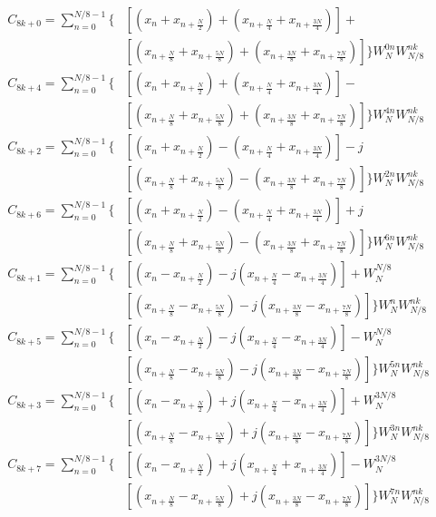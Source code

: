 \documentclass[journal,comsoc]{IEEEtran}
\begin{document}
\begin{align}\label{eqn:radix}
C_{8k+0} = \sum_{n=0}^{N/8-1} \bigg\{&[(x_n + x_{n+\frac{N}{2}}) + (x_{n+\frac{N}{4}} + x_{n+\frac{3N}{4}})] + 	   				    \\
&[(x_{n+\frac{N}{8}} + x_{n+\frac{5N}{8}}) + (x_{n+\frac{3N}{8}} + x_{n+\frac{7N}{8}})] \bigg\} W_N^{0n} W_{N/8}^ {nk}     \nonumber\\
%	
C_{8k+4} = \sum_{n=0}^{N/8-1} \bigg\{&[(x_n + x_{n+\frac{N}{2}}) + (x_{n+\frac{N}{4}} + x_{n+\frac{3N}{4}})] - 			   \nonumber\\
&[(x_{n+\frac{N}{8}} + x_{n+\frac{5N}{8}}) + (x_{n+\frac{3N}{8}} + x_{n+\frac{7N}{8}})] \bigg\} W_N^{4n} W_{N/8}^ {nk}     \nonumber\\
%
C_{8k+2} = \sum_{n=0}^{N/8-1} \bigg\{&[(x_n + x_{n+\frac{N}{2}}) - (x_{n+\frac{N}{4}} + x_{n+\frac{3N}{4}})] -j 		   \nonumber\\
&[(x_{n+\frac{N}{8}} + x_{n+\frac{5N}{8}}) - (x_{n+\frac{3N}{8}} + x_{n+\frac{7N}{8}})] \bigg\} W_N^{2n} W_{N/8}^ {nk}     \nonumber\\
%
C_{8k+6} = \sum_{n=0}^{N/8-1} \bigg\{&[(x_n + x_{n+\frac{N}{2}}) - (x_{n+\frac{N}{4}} + x_{n+\frac{3N}{4}})] +j			   \nonumber\\
&[(x_{n+\frac{N}{8}} + x_{n+\frac{5N}{8}}) - (x_{n+\frac{3N}{8}} + x_{n+\frac{7N}{8}})] \bigg\} W_N^{6n} W_{N/8}^ {nk}     \nonumber\\
%
C_{8k+1} = \sum_{n=0}^{N/8-1} \bigg\{&[(x_n - x_{n+\frac{N}{2}}) -j (x_{n+\frac{N}{4}} - x_{n+\frac{3N}{4}})] + W_N^{N/8}  \nonumber\\
&[(x_{n+\frac{N}{8}} - x_{n+\frac{5N}{8}}) -j (x_{n+\frac{3N}{8}} - x_{n+\frac{7N}{8}})] \bigg\} W_N^{n} W_{N/8}^ {nk}     \nonumber\\
%
C_{8k+5} = \sum_{n=0}^{N/8-1} \bigg\{&[(x_n - x_{n+\frac{N}{2}}) -j (x_{n+\frac{N}{4}} - x_{n+\frac{3N}{4}})] - W_N^{N/8}  \nonumber\\
&[(x_{n+\frac{N}{8}} - x_{n+\frac{5N}{8}}) -j (x_{n+\frac{3N}{8}} - x_{n+\frac{7N}{8}})] \bigg\} W_N^{5n} W_{N/8}^ {nk}    \nonumber\\
%
C_{8k+3} = \sum_{n=0}^{N/8-1} \bigg\{&[(x_n - x_{n+\frac{N}{2}}) +j (x_{n+\frac{N}{4}} - x_{n+\frac{3N}{4}})] + W_N^{3N/8} \nonumber\\
&[(x_{n+\frac{N}{8}} - x_{n+\frac{5N}{8}}) +j (x_{n+\frac{3N}{8}} - x_{n+\frac{7N}{8}})] \bigg\} W_N^{3n} W_{N/8}^ {nk}    \nonumber\\
%
C_{8k+7} = \sum_{n=0}^{N/8-1} \bigg\{&[(x_n - x_{n+\frac{N}{2}}) +j (x_{n+\frac{N}{4}} + x_{n+\frac{3N}{4}})] - W_N^{3N/8} \nonumber\\
&[(x_{n+\frac{N}{8}} - x_{n+\frac{5N}{8}}) +j (x_{n+\frac{3N}{8}} - x_{n+\frac{7N}{8}})] \bigg\} W_N^{7n} W_{N/8}^ {nk}    \nonumber	
\end{align}
\end{document}
